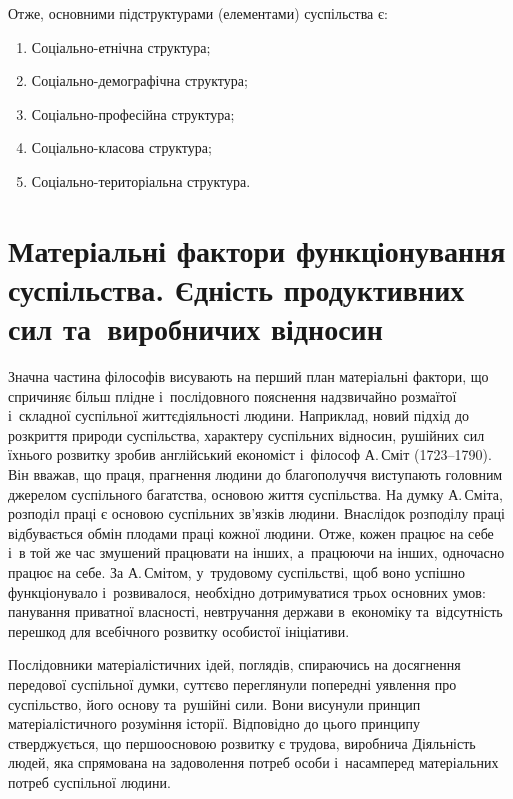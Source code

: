 \documentclass[a5paper,oneside,DIV=12,12pt,headings=small]{scrartcl}
\begin{document}
		Отже, основними підструктурами (елементами) суспільства є:
		\begin{enumerate}
			\item Соціально-етнічна структура;
			\item Соціально-демографічна структура;
			\item Соціально-професійна структура;
			\item Соціально-класова структура;
			\item Соціально-територіальна структура.
		\end{enumerate}

	\section{Матеріальні фактори функціонування суспільства. Єдність продуктивних сил та~виробничих відносин}
		Значна частина філософів висувають на перший план матеріальні фактори, що спричиняє більш плідне і~послідовного пояснення надзвичайно розмаїтої і~складної суспільної життєдіяльності людини. Наприклад, новий підхід до розкриття природи суспільства, характеру суспільних відносин, рушійних сил їхнього розвитку зробив англійський економіст і~філософ А.\,Сміт (1723–1790). Він вважав, що праця, прагнення людини до благополуччя виступають головним джерелом суспільного багатства, основою життя суспільства. На думку А.\,Сміта, розподіл праці є основою суспільних зв'язків людини. Внаслідок розподілу праці відбувається обмін плодами праці кожної людини. Отже, кожен працює на себе і~в той же час змушений працювати на інших, а~працюючи на інших, одночасно працює на себе. За А.\,Смітом, у~трудовому суспільстві, щоб воно успішно функціонувало і~розвивалося, необхідно дотримуватися трьох основних умов: панування приватної власності, невтручання держави в~економіку та~відсутність перешкод для всебічного розвитку особистої ініціативи.

		Послідовники матеріалістичних ідей, поглядів, спираючись на досягнення передової суспільної думки, суттєво переглянули попередні уявлення про суспільство, його основу та~рушійні сили. Вони висунули принцип матеріалістичного розуміння історії. Відповідно до цього принципу стверджується, що першоосновою розвитку є трудова, виробнича Діяльність людей, яка спрямована на задоволення потреб особи і~насамперед матеріальних потреб суспільної людини.
\end{document}
